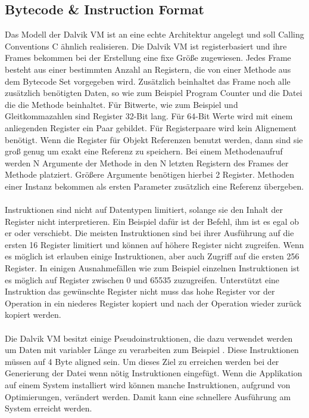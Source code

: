 \documentclass[11pt,conference,a4paper]{IEEEtran}
\begin{document}
\subsection{Bytecode \& Instruction Format}
Das Modell der Dalvik VM ist an eine echte Architektur angelegt und soll Calling Conventions C ähnlich realisieren. 
Die Dalvik VM ist registerbasiert und ihre Frames bekommen bei der Erstellung eine fixe Größe zugewiesen. Jedes Frame besteht aus einer bestimmten Anzahl an Registern, die von einer Methode aus dem Bytecode Set vorgegeben wird. Zusätzlich beinhaltet das Frame noch alle zusätzlich benötigten Daten, so wie zum Beispiel Program Counter und die  Datei die die Methode beinhaltet.
Für Bitwerte, wie zum Beispiel  und Gleitkommazahlen sind Register 32-Bit lang. Für 64-Bit Werte wird mit einem anliegenden Register ein Paar gebildet. Für Registerpaare wird kein Alignement benötigt. Wenn die Register für Objekt Referenzen benutzt werden, dann sind sie groß genug um exakt eine Referenz zu speichern. Bei einem Methodenaufruf werden N Argumente der Methode in den N letzten Registern des Frames der Methode platziert. Größere Argumente benötigen hierbei 2 Register. Methoden einer Instanz bekommen als ersten Parameter zusätzlich eine  Referenz übergeben.
\\
\\
Instruktionen sind nicht auf Datentypen limitiert, solange sie den Inhalt der Register nicht interpretieren. Ein Beispiel dafür ist der  Befehl, ihm ist es egal ob er  oder  verschiebt. Die meisten Instruktionen sind bei ihrer Ausführung auf die ersten 16 Register limitiert und können auf höhere Register nicht zugreifen. Wenn es möglich ist erlauben einige Instruktionen, aber auch Zugriff auf die ersten 256 Register. In einigen Ausnahmefällen wie zum Beispiel einzelnen  Instruktionen ist es möglich auf Register zwischen 0 und 65535 zuzugreifen.
Unterstützt eine Instruktion das gewünschte Register nicht muss das hohe Register vor der Operation in ein niederes Register kopiert und nach der Operation wieder zurück kopiert werden.
\\
\\
Die Dalvik VM besitzt einige Pseudoinstruktionen, die dazu verwendet werden um Daten mit variabler Länge zu verarbeiten zum Beispiel . Diese Instruktionen müssen auf 4 Byte aligned sein. Um dieses Ziel zu erreichen werden bei der Generierung der  Datei wenn nötig  Instruktionen eingefügt. Wenn die Applikation auf einem System installiert wird können manche Instruktionen, aufgrund von Optimierungen, verändert werden. Damit kann eine schnellere Ausführung am System erreicht werden.
\end{document}

